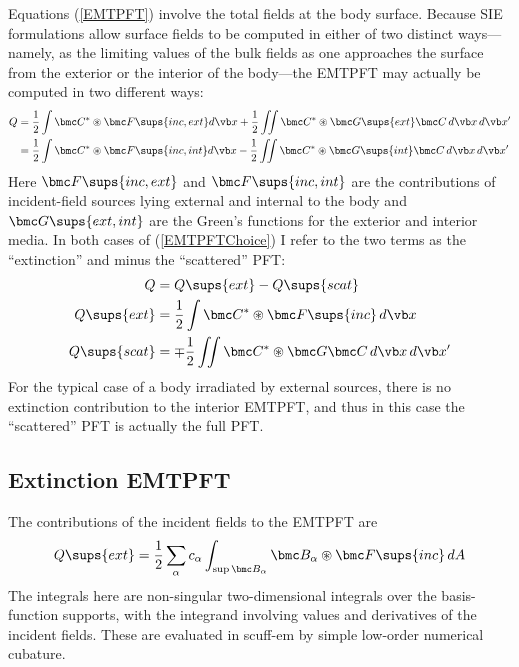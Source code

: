 Equations (\ref{EMTPFT}) involve the total fields at the
body surface. Because SIE formulations allow surface fields
to be computed in either of two distinct ways---namely, as the
limiting values of the bulk fields as one approaches the
surface from the exterior or the interior of the body---the EMTPFT
may actually be computed in two different ways:
\begin{subequations}
\begin{align}
 Q &= \frac{1}{2}  \int \bmc C^* \circledast \bmc F\sups{inc,ext} d\vb x
     +\frac{1}{2} \iint \bmc C^* \circledast \bmc G\sups{ext} \bmc C\,d\vb x \,d\vb x^\prime
\\
   &= \frac{1}{2}  \int \bmc C^* \circledast \bmc F\sups{inc,int} d\vb x
     -\frac{1}{2} \iint \bmc C^* \circledast \bmc G\sups{int} \bmc C\,d\vb x \,d\vb x^\prime
\end{align}
\label{EMTPFTChoice}
\end{subequations}
Here $\bmc F\sups{inc,ext}$ and $\bmc F\sups{inc,int}$ are
the contributions of incident-field sources lying external and internal
to the body and $\bmc G\sups{ext,int}$ are the Green's functions
for the exterior and interior media.
In both cases of (\ref{EMTPFTChoice}) I refer to the two
terms as the ``extinction'' and minus the ``scattered''
PFT:
\begin{align*}
 Q&=Q\sups{ext} - Q\sups{scat}
\\
 Q\sups{ext}
&=\frac{1}{2}\int \bmc C^* \circledast \bmc F\sups{inc} \, d\vb x
\\
 Q\sups{scat}
&=\mp \frac{1}{2} \iint \bmc C^* \circledast \bmc G \bmc C\,d\vb x \, d\vb x^\prime
\end{align*}
For the typical case of a body irradiated by external sources,
there is no extinction contribution to the interior EMTPFT, and 
thus in this case the ``scattered'' PFT is actually the full PFT.

\subsection{Extinction EMTPFT}

The contributions of the incident fields to the EMTPFT are
$$ Q\sups{ext}=
   \frac{1}{2}\sum_{\alpha} c_\alpha
   \int_{\sup \bmc B_\alpha} \bmc B_\alpha \circledast \bmc F\sups{inc} \, dA
$$
The integrals here are non-singular two-dimensional integrals over
the basis-function supports, with the integrand involving values 
and derivatives of the incident fields. These are evaluated 
in {\sc scuff-em} by simple low-order numerical cubature.

